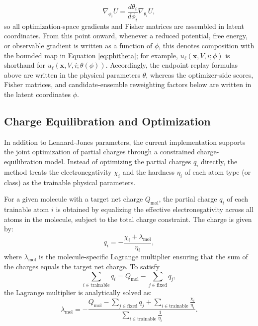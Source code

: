 \begin{equation}
    \nabla_{\phi_i} U
    =
    \frac{d \theta_i}{d \phi_i}
    \nabla_{\theta_i} U,
    \label{eq:chainphi}
\end{equation}
%
so all optimization-space gradients and Fisher matrices are assembled in latent coordinates. From this point onward, whenever a reduced potential, free energy, or observable gradient is written as a function of $\phi$, this denotes composition with the bounded map in Equation \eqref{eq:phitheta}; for example, $u_\ell(\mathbf{x}, V, i; \phi)$ is shorthand for $u_\ell(\mathbf{x}, V, i; \theta(\phi))$. Accordingly, the endpoint replay formulas above are written in the physical parameters $\theta$, whereas the optimizer-side scores, Fisher matrices, and candidate-ensemble reweighting factors below are written in the latent coordinates $\phi$.

\subsection{Charge Equilibration and Optimization}

In addition to Lennard-Jones parameters, the current implementation supports the joint optimization of partial charges through a constrained charge-equilibration model. Instead of optimizing the partial charges $q_i$ directly, the method treats the electronegativity $\chi_i$ and the hardness $\eta_i$ of each atom type (or class) as the trainable physical parameters.

For a given molecule with a target net charge $Q_{\mathrm{mol}}$, the partial charge $q_i$ of each trainable atom $i$ is obtained by equalizing the effective electronegativity across all atoms in the molecule, subject to the total charge constraint. The charge is given by:
\begin{equation}
    q_i
    =
    -\frac{\chi_i + \lambda_{\mathrm{mol}}}{\eta_i},
    \label{eq:qi_charge}
\end{equation}
where $\lambda_{\mathrm{mol}}$ is the molecule-specific Lagrange multiplier ensuring that the sum of the charges equals the target net charge. To satisfy
\begin{equation}
    \sum_{i \in \mathrm{trainable}} q_i
    =
    Q_{\mathrm{mol}} - \sum_{j \in \mathrm{fixed}} q_j,
\end{equation}
the Lagrange multiplier is analytically solved as:
\begin{equation}
    \lambda_{\mathrm{mol}}
    =
    -
    \frac{
        Q_{\mathrm{mol}} - \sum_{j \in \mathrm{fixed}} q_j
        +
        \sum_{i \in \mathrm{trainable}} \frac{\chi_i}{\eta_i}
    }{
        \sum_{i \in \mathrm{trainable}} \frac{1}{\eta_i}
    }.
    \label{eq:lagrange_mol}
\end{equation}

